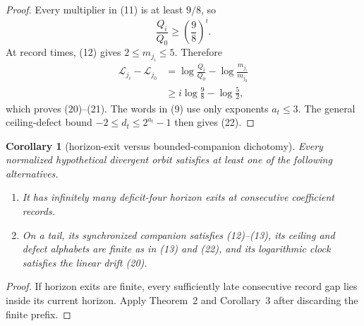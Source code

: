 \documentclass[11pt]{article}
\newtheorem{corollary}[theorem]{Corollary}
\begin{document}
\begin{proof}
Every multiplier in (11) is at least $9/8$, so
\[
  \frac{Q_i}{Q_0}\geq\left(\frac98\right)^i.
\]
At record times, (12) gives $2\leq m_{j_i}\leq5$.  Therefore
\[
\begin{aligned}
  \mathcal L_{j_i}-\mathcal L_{j_0}
  &=\log\frac{Q_i}{Q_0}-\log\frac{m_{j_i}}{m_{j_0}}\\
  &\geq i\log\frac98-\log\frac52,
\end{aligned}
\]
which proves (20)--(21).  The words in (9) use only exponents
$a_t\leq3$.  The general ceiling-defect bound
$-2\leq d_t\leq2^{a_t}-1$ then gives (22).
\end{proof}

\begin{corollary}[horizon-exit versus bounded-companion dichotomy]
Every normalized hypothetical divergent orbit satisfies at least one of
the following alternatives.
\begin{enumerate}
  \item It has infinitely many deficit-four horizon exits at consecutive
  coefficient records.
  \item On a tail, its synchronized companion satisfies (12)--(13), its
  ceiling and defect alphabets are finite as in (13) and (22), and its
  logarithmic clock satisfies the linear drift (20).

\end{enumerate}
\end{corollary}

\begin{proof}
If horizon exits are finite, every sufficiently late consecutive record
gap lies inside its current horizon.  Apply Theorem~2 and Corollary~3 after
discarding the finite prefix.
\end{proof}
\end{document}

